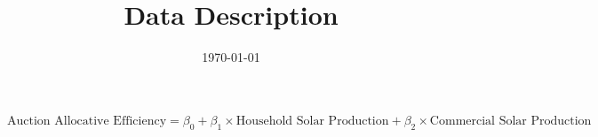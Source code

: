 \documentclass{article} %
\title{Data Description} %
\date{\today}              %
\begin{document}

\[
\text{Auction Allocative Efficiency} = \beta_0 + \beta_1 \times \text{Household Solar Production} + \beta_2 \times \text{Commercial Solar Production}
\]
\end{document}
